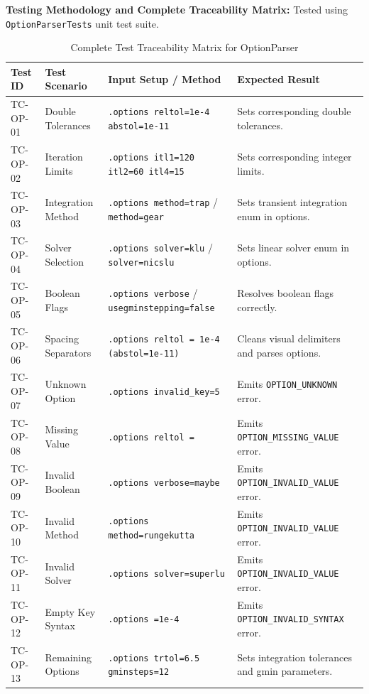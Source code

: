 \textbf{Testing Methodology and Complete Traceability Matrix:} Tested using \texttt{OptionParserTests} unit test suite.
\newpage
\begin{table}[H]
\centering
\small
\begin{tabular}{|l|l|p{4.5cm}|p{4.5cm}|}
\hline
\textbf{Test ID} & \textbf{Test Scenario} & \textbf{Input Setup / Method} & \textbf{Expected Result} \\
\hline
TC-OP-01 & Double Tolerances & \texttt{.options reltol=1e-4 abstol=1e-11} & Sets corresponding double tolerances. \\
\hline
TC-OP-02 & Iteration Limits & \texttt{.options itl1=120 itl2=60 itl4=15} & Sets corresponding integer limits. \\
\hline
TC-OP-03 & Integration Method & \texttt{.options method=trap} / \texttt{method=gear} & Sets transient integration enum in options. \\
\hline
TC-OP-04 & Solver Selection & \texttt{.options solver=klu} / \texttt{solver=nicslu} & Sets linear solver enum in options. \\
\hline
TC-OP-05 & Boolean Flags & \texttt{.options verbose} / \texttt{usegminstepping=false} & Resolves boolean flags correctly. \\
\hline
TC-OP-06 & Spacing Separators & \texttt{.options reltol = 1e-4 (abstol=1e-11)} & Cleans visual delimiters and parses options. \\
\hline
TC-OP-07 & Unknown Option & \texttt{.options invalid\_key=5} & Emits \texttt{OPTION\_UNKNOWN} error. \\
\hline
TC-OP-08 & Missing Value & \texttt{.options reltol =} & Emits \texttt{OPTION\_MISSING\_VALUE} error. \\
\hline
TC-OP-09 & Invalid Boolean & \texttt{.options verbose=maybe} & Emits \texttt{OPTION\_INVALID\_VALUE} error. \\
\hline
TC-OP-10 & Invalid Method & \texttt{.options method=rungekutta} & Emits \texttt{OPTION\_INVALID\_VALUE} error. \\
\hline
TC-OP-11 & Invalid Solver & \texttt{.options solver=superlu} & Emits \texttt{OPTION\_INVALID\_VALUE} error. \\
\hline
TC-OP-12 & Empty Key Syntax & \texttt{.options =1e-4} & Emits \texttt{OPTION\_INVALID\_SYNTAX} error. \\
\hline
TC-OP-13 & Remaining Options & \texttt{.options trtol=6.5 gminsteps=12} & Sets integration tolerances and gmin parameters. \\
\hline
\end{tabular}
\caption{Complete Test Traceability Matrix for OptionParser}
\end{table}


